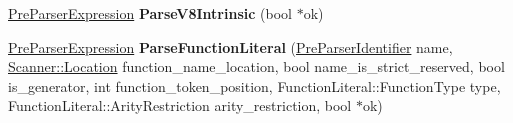 \begin{DoxyCompactItemize}
\item 
\hypertarget{classv8_1_1internal_1_1_pre_parser_traits_a4b3b4c0d65204fb58b0278768733d4e9}{}\hyperlink{classv8_1_1internal_1_1_pre_parser_expression}{Pre\+Parser\+Expression} {\bfseries Parse\+V8\+Intrinsic} (bool $\ast$ok)\label{classv8_1_1internal_1_1_pre_parser_traits_a4b3b4c0d65204fb58b0278768733d4e9}

\item 
\hypertarget{classv8_1_1internal_1_1_pre_parser_traits_a124d3618f8cffba04e3a459f9c3bcbf4}{}\hyperlink{classv8_1_1internal_1_1_pre_parser_expression}{Pre\+Parser\+Expression} {\bfseries Parse\+Function\+Literal} (\hyperlink{classv8_1_1internal_1_1_pre_parser_identifier}{Pre\+Parser\+Identifier} name, \hyperlink{structv8_1_1internal_1_1_scanner_1_1_location}{Scanner\+::\+Location} function\+\_\+name\+\_\+location, bool name\+\_\+is\+\_\+strict\+\_\+reserved, bool is\+\_\+generator, int function\+\_\+token\+\_\+position, Function\+Literal\+::\+Function\+Type type, Function\+Literal\+::\+Arity\+Restriction arity\+\_\+restriction, bool $\ast$ok)\label{classv8_1_1internal_1_1_pre_parser_traits_a124d3618f8cffba04e3a459f9c3bcbf4}

\end{DoxyCompactItemize}
